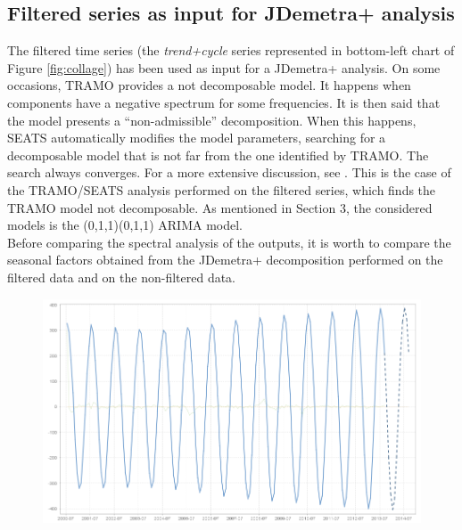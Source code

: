 \documentclass[english,blauw]{cbsdiscussionpaper}
\begin{document}
\subsection{Filtered series as input for JDemetra+ analysis}
The filtered time series (the \textit{trend+cycle} series represented in bottom-left chart of Figure \ref{fig:collage}) has been used as input for a JDemetra+ analysis. On some occasions, TRAMO provides a not decomposable model. It happens when components have a negative spectrum for some frequencies. It is then said that the model presents a “non-admissible” decomposition. When this happens, SEATS automatically modifies the model parameters, searching for a decomposable model that is not far from the one identified by TRAMO. The search always converges. For a more extensive discussion, see \citep{mar2008}. This is the case of the TRAMO/SEATS analysis performed on the filtered series, which finds the TRAMO model not decomposable. As mentioned in Section 3, the considered models is the (0,1,1)(0,1,1) ARIMA model.\\ Before comparing the spectral analysis of the outputs, it is worth to compare the seasonal factors obtained from the JDemetra+ decomposition performed on the filtered data and on the non-filtered data.
\begin{figure}[h]
\includegraphics[width=\linewidth]{../images/capitolo4/X13_seas_cmp_filtered.jpg}
\end{figure}
\end{document}
